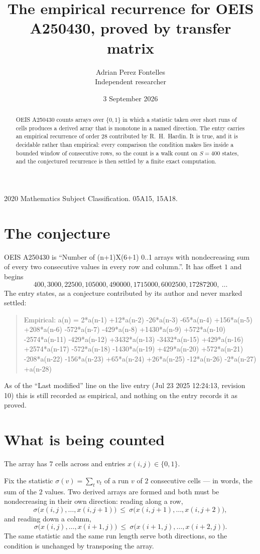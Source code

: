 \documentclass[11pt,a4paper]{article}
\title{The empirical recurrence for OEIS A250430, proved by transfer matrix}
\author{Adrian Perez Fontelles\\ \small Independent researcher}
\date{3 September 2026}
\theoremstyle{plain}
\theoremstyle{definition}
\begin{document}
\maketitle

\begin{abstract}
OEIS A250430 counts arrays over $\{0,1\}$ in which a statistic taken over short runs
of cells produces a derived array that is monotone in a named direction. The entry carries an
empirical recurrence of order $28$ contributed by R.~H.~Hardin. It is true, and it is
decidable rather than empirical: every comparison the condition makes lies inside a bounded
window of consecutive rows, so the count is a walk count on $S=400$ states, and the
conjectured recurrence is then settled by a finite exact computation.
\end{abstract}

\noindent\small 2020 Mathematics Subject Classification. 05A15, 15A18.\normalsize

\section{The conjecture}

OEIS A250430 is ``Number of (n+1)X(6+1) 0..1 arrays with nondecreasing sum of every two consecutive values in every row and column.''. It has offset $1$ and begins
\[
400, 3000, 22500, 105000, 490000, 1715000, 6002500, 17287200,\ \dots
\]
The entry states, as a conjecture contributed by its author and never marked settled:
\begin{quote}
Empirical: a(n) = 2*a(n-1) +12*a(n-2) -26*a(n-3) -65*a(n-4) +156*a(n-5) +208*a(n-6) -572*a(n-7) -429*a(n-8) +1430*a(n-9) +572*a(n-10) -2574*a(n-11) -429*a(n-12) +3432*a(n-13) -3432*a(n-15) +429*a(n-16) +2574*a(n-17) -572*a(n-18) -1430*a(n-19) +429*a(n-20) +572*a(n-21) -208*a(n-22) -156*a(n-23) +65*a(n-24) +26*a(n-25) -12*a(n-26) -2*a(n-27) +a(n-28)
\end{quote}
As of the ``Last modified'' line on the live entry (Jul 23 2025 12:24:13, revision 10) this is still
recorded as empirical, and nothing on the entry records it as proved.

\section{What is being counted}

The array has $7$ cells across and entries $x(i,j)\in\{0,1\}$.

Fix the statistic $\sigma(v)=\sum_{t} v_t$ of a run $v$ of $2$ consecutive cells --- in words,
the sum of the $2$ values. Two derived arrays are formed and both must be
nondecreasing in their own direction: reading along a row,
\[
\sigma\bigl(x(i,j),\dots,x(i,j{+}1)\bigr)\ \le\
\sigma\bigl(x(i,j{+}1),\dots,x(i,j{+}2)\bigr),
\]
and reading down a column,
\[
\sigma\bigl(x(i,j),\dots,x(i{+}1,j)\bigr)\ \le\
\sigma\bigl(x(i{+}1,j),\dots,x(i{+}2,j)\bigr).
\]
The same statistic and the same run length serve both directions, so the condition is
unchanged by transposing the array.
\end{document}

